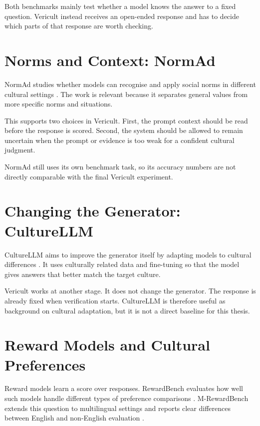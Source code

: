 Both benchmarks mainly test whether a model knows the answer to a fixed question. Vericult instead receives an open-ended response and has to decide which parts of that response are worth checking.

\section{Norms and Context: NormAd}

NormAd studies whether models can recognise and apply social norms in different cultural settings \parencite{rao2025normad}. The work is relevant because it separates general values from more specific norms and situations.

This supports two choices in Vericult. First, the prompt context should be read before the response is scored. Second, the system should be allowed to remain uncertain when the prompt or evidence is too weak for a confident cultural judgment.

NormAd still uses its own benchmark task, so its accuracy numbers are not directly comparable with the final Vericult experiment.

\section{Changing the Generator: CultureLLM}

CultureLLM aims to improve the generator itself by adapting models to cultural differences \parencite{li2024culturellm}. It uses culturally related data and fine-tuning so that the model gives answers that better match the target culture.

Vericult works at another stage. It does not change the generator. The response is already fixed when verification starts. CultureLLM is therefore useful as background on cultural adaptation, but it is not a direct baseline for this thesis.

\section{Reward Models and Cultural Preferences}

Reward models learn a score over responses. RewardBench evaluates how well such models handle different types of preference comparisons \parencite{lambert2025rewardbench}. M-RewardBench extends this question to multilingual settings and reports clear differences between English and non-English evaluation \parencite{gureja2025mrewardbench}.

